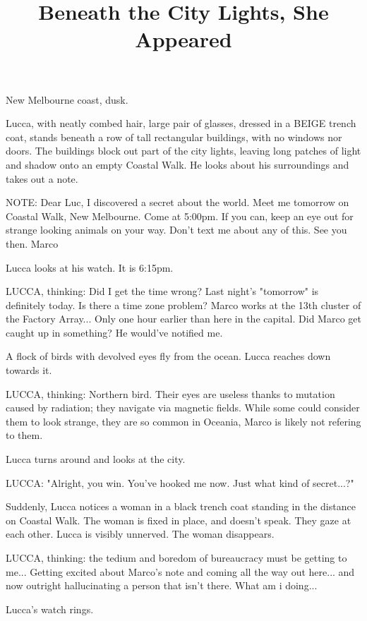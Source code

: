 \documentclass[11pt]{article}
\begin{document}
\ttfamily
\title{Beneath the City Lights, She Appeared}
\maketitle

New Melbourne coast, dusk.

Lucca, with neatly combed hair, large pair of glasses, dressed in a BEIGE trench coat, stands beneath a row of tall rectangular buildings, with no windows nor doors. 
The buildings block out part of the city lights, leaving long patches of light and shadow onto an empty Coastal Walk.
He looks about his surroundings and takes out a note.

NOTE: Dear Luc, I discovered a secret about the world. 
Meet me tomorrow on Coastal Walk, New Melbourne. Come at 5:00pm.
If you can, keep an eye out for strange looking animals on your way. 
Don't text me about any of this. See you then.
Marco

Lucca looks at his watch. It is 6:15pm. 

LUCCA, thinking: Did I get the time wrong? Last night's "tomorrow" is definitely today. 
Is there a time zone problem? Marco works at the 13th cluster of the Factory Array... Only one hour earlier than here in the capital. 
Did Marco get caught up in something? He would've notified me.

A flock of birds with devolved eyes fly from the ocean. Lucca reaches down towards it.

LUCCA, thinking: Northern bird. Their eyes are useless thanks to mutation caused by radiation; they navigate via magnetic fields. While some could consider them to look strange, they are so common in Oceania, Marco is likely not refering to them. 

Lucca turns around and looks at the city.

LUCCA: "Alright, you win. You've hooked me now. Just what kind of secret...?"

Suddenly, Lucca notices a woman in a black trench coat standing in the distance on Coastal Walk. The woman is fixed in place, and doesn't speak. They gaze at each other. Lucca is visibly unnerved. The woman disappears. 

LUCCA, thinking: the tedium and boredom of bureaucracy must be getting to me... Getting excited about Marco's note and coming all the way out here... and now outright hallucinating a person that isn't there. What am i doing...

Lucca's watch rings. 
\end{document}
